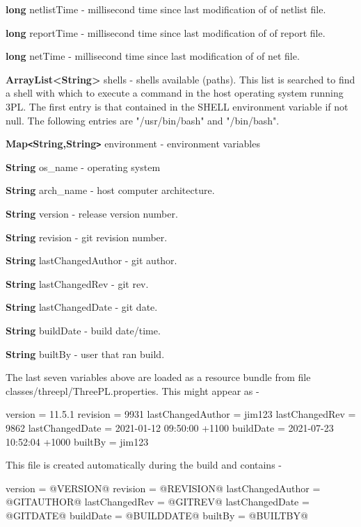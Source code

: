 \documentclass[10pt,a4paper,twoside,fleqn]{book}
\begin{document}
            {\bf long} netlistTime - millisecond time since last modification of of netlist file.

            {\bf long} reportTime - millisecond time since last modification of of report file.

            {\bf long} netTime - millisecond time since last modification of of net file.

            {\bf ArrayList<String>} shells - shells available (paths). This list
            is searched to find a shell with which to execute a command in the host
            operating system running 3PL. The first entry is that contained in the
            SHELL environment variable if not null. The following entries are
            "/usr/bin/bash" and "/bin/bash".

            {\bf Map\verb'<'String,String\verb'>'} environment - environment variables

            {\bf String} os\_name - operating system

            {\bf String} arch\_name - host computer architecture.

            {\bf String} version - release version number.

            {\bf String} revision - git revision number.

            {\bf String} lastChangedAuthor - git author.

            {\bf String} lastChangedRev - git rev.

            {\bf String} lastChangedDate - git date.

            {\bf String} buildDate - build date/time.

            {\bf String} builtBy - user that ran build.
            
            The last seven variables above are loaded as a resource bundle from file
            classes/threepl/ThreePL.properties. This might appear as -\\          
            \begin{verbatimtab}
                version = 11.5.1
                revision = 9931
                lastChangedAuthor = jim123
                lastChangedRev = 9862
                lastChangedDate = 2021-01-12 09:50:00 +1100
                buildDate = 2021-07-23 10:52:04 +1000
                builtBy = jim123
            \end{verbatimtab}
            
            This file is created automatically during the build and contains -\\
            \begin{verbatimtab}
                version = @VERSION@
                revision = @REVISION@
                lastChangedAuthor = @GITAUTHOR@
                lastChangedRev = @GITREV@
                lastChangedDate = @GITDATE@
                buildDate = @BUILDDATE@
                builtBy = @BUILTBY@
            \end{verbatimtab}
            
\end{document}

